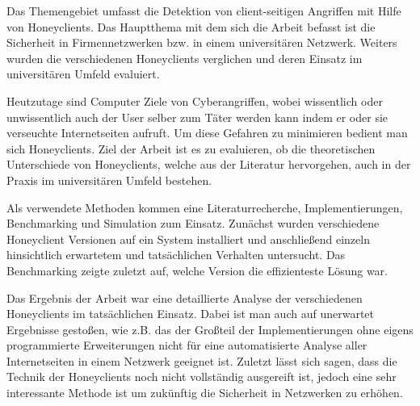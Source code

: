  Das Themengebiet umfasst die Detektion von
client-seitigen Angriffen mit Hilfe von Honeyclients. Das Hauptthema mit dem
sich die Arbeit befasst ist die  Sicherheit in Firmennetzwerken bzw. in einem
universitären Netzwerk. Weiters wurden die verschiedenen Honeyclients
verglichen und deren Einsatz im universitären Umfeld evaluiert.

 Heutzutage sind Computer Ziele von Cyberangriffen,
wobei wissentlich oder unwissentlich auch der User selber zum Täter werden
kann indem er oder sie verseuchte Internetseiten aufruft. Um diese Gefahren zu
minimieren bedient man sich Honeyclients. Ziel der Arbeit ist es zu
evaluieren, ob die theoretischen Unterschiede von Honeyclients, welche aus
der Literatur hervorgehen, auch in der Praxis im universitären Umfeld
bestehen.

 Als verwendete Methoden kommen eine
Literaturrecherche, Implementierungen, Benchmarking und Simulation zum
Einsatz. Zunächst wurden verschiedene Honeyclient Versionen auf ein System
installiert und anschließend einzeln hinsichtlich erwartetem und tatsächlichen
Verhalten untersucht. Das Benchmarking zeigte zuletzt auf, welche  Version die
effizienteste Lösung war.

 Das Ergebnis der Arbeit war eine detaillierte Analyse der
verschiedenen Honeyclients im tatsächlichen Einsatz. Dabei ist man auch auf
unerwartet Ergebnisse gestoßen, wie z.B. das der Großteil der
Implementierungen ohne eigens programmierte Erweiterungen nicht für eine
automatisierte Analyse aller Internetseiten in einem Netzwerk geeignet ist.
Zuletzt lässt sich sagen, dass die Technik der Honeyclients noch nicht
vollständig ausgereift ist, jedoch eine sehr interessante Methode ist um
zukünftig die Sicherheit in Netzwerken zu erhöhen.


